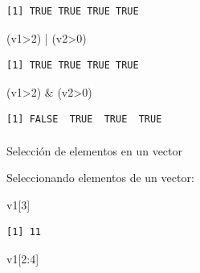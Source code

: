 \documentclass[
  letterpaper,
  DIV=11,
  numbers=noendperiod]{scrartcl}
\makeatletter
\let\oldparagraph\paragraph
\renewcommand{\paragraph}{
    \@ifstar
      \xxxParagraphStar
      \xxxParagraphNoStar
  }
\newcommand{\xxxParagraphStar}[1]{\oldparagraph*{#1}\mbox{}}
\newcommand{\xxxParagraphNoStar}[1]{\oldparagraph{#1}\mbox{}}
\newenvironment{Shaded}{\begin{snugshade}}{\end{snugshade}}
\newcommand{\DecValTok}[1]{\textcolor[rgb]{0.68,0.00,0.00}{#1}}
\newcommand{\NormalTok}[1]{\textcolor[rgb]{0.00,0.23,0.31}{#1}}
\newcommand{\SpecialCharTok}[1]{\textcolor[rgb]{0.37,0.37,0.37}{#1}}
\makeatother
\begin{document}
\begin{verbatim}
[1] TRUE TRUE TRUE TRUE
\end{verbatim}

\begin{Shaded}
\begin{Highlighting}[]
\NormalTok{(v1}\SpecialCharTok{\textgreater{}}\DecValTok{2}\NormalTok{) }\SpecialCharTok{|}\NormalTok{ (v2}\SpecialCharTok{\textgreater{}}\DecValTok{0}\NormalTok{)   }
\end{Highlighting}
\end{Shaded}

\begin{verbatim}
[1] TRUE TRUE TRUE TRUE
\end{verbatim}

\begin{Shaded}
\begin{Highlighting}[]
\NormalTok{(v1}\SpecialCharTok{\textgreater{}}\DecValTok{2}\NormalTok{) }\SpecialCharTok{\&}\NormalTok{ (v2}\SpecialCharTok{\textgreater{}}\DecValTok{0}\NormalTok{)   }
\end{Highlighting}
\end{Shaded}

\begin{verbatim}
[1] FALSE  TRUE  TRUE  TRUE
\end{verbatim}

\paragraph{Selección de elementos en un
vector}\label{selecciuxf3n-de-elementos-en-un-vector}

Seleccionando elementos de un vector:

\begin{Shaded}
\begin{Highlighting}[]
\NormalTok{v1[}\DecValTok{3}\NormalTok{]             }
\end{Highlighting}
\end{Shaded}

\begin{verbatim}
[1] 11
\end{verbatim}

\begin{Shaded}
\begin{Highlighting}[]
\NormalTok{v1[}\DecValTok{2}\SpecialCharTok{:}\DecValTok{4}\NormalTok{]           }
\end{Highlighting}
\end{Shaded}
\end{document}

